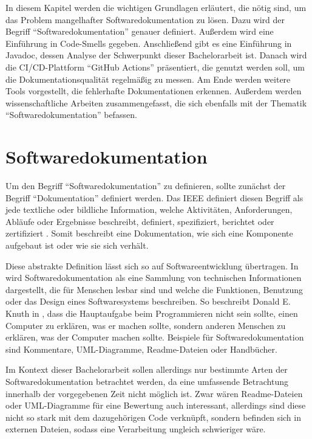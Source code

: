 \label{sec:background}
In diesem Kapitel werden die wichtigen Grundlagen erläutert, die nötig sind, um das Problem mangelhafter Softwaredokumentation zu lösen.  Dazu  wird der Begriff \enquote{Softwaredokumentation} genauer definiert. Außerdem wird eine Einführung in Code-Smells gegeben.  Anschließend gibt es eine Einführung in Javadoc, dessen Analyse der Schwerpunkt dieser Bachelorarbeit ist. Danach wird die \ac{CI/CD}-Plattform \enquote{GitHub Actions} präsentiert, die genutzt werden soll, um die Dokumentationsqualität regelmäßig zu messen. Am Ende werden weitere Tools vorgestellt, die fehlerhafte Dokumentationen erkennen. Außerdem werden wissenschaftliche Arbeiten zusammengefasst, die sich ebenfalls mit der Thematik \enquote{Softwaredokumentation} befassen. 
 

\hfill
\section{Softwaredokumentation}\label{chapter:documentation}
Um den Begriff \enquote{Softwaredokumentation} zu definieren, sollte zunächst der Begriff \enquote{Dokumentation} definiert werden. Das IEEE  definiert diesen Begriff als jede textliche oder bildliche Information, welche Aktivitäten, Anforderungen, Abläufe oder Ergebnisse beschreibt, definiert, spezifiziert, berichtet oder zertifiziert \cite[S.~28]{IEEEStandardGlossaryofSoftwareEngineeringTerminology}. Somit beschreibt eine Dokumentation, wie sich eine Komponente aufgebaut ist oder wie sie sich verhält.

Diese abstrakte Definition lässt sich so auf Softwareentwicklung übertragen. In \cite[S.~125]{Softwaredocumentationandstandards} wird Softwaredokumentation als eine Sammlung von technischen Informationen dargestellt, die für Menschen lesbar sind und welche die Funktionen, Benutzung oder das Design eines Softwaresystems beschreiben. So beschreibt Donald E. Knuth in \cite[S.~97]{LiterateProgramming}, dass die Hauptaufgabe beim Programmieren nicht sein sollte, einen Computer zu erklären, was er machen sollte, sondern anderen Menschen zu erklären, was der Computer machen sollte. Beispiele für Softwaredokumentation sind Kommentare,  UML-Diagramme, Readme-Dateien oder Handbücher.

Im Kontext dieser Bachelorarbeit sollen allerdings nur bestimmte Arten der Softwaredokumentation betrachtet werden, da eine umfassende Betrachtung innerhalb der vorgegebenen Zeit nicht möglich ist.  Zwar wären Readme-Dateien oder UML-Diagramme für eine Bewertung auch interessant, allerdings sind diese nicht so stark mit dem dazugehörigen Code verknüpft, sondern befinden sich in externen Dateien, sodass eine Verarbeitung ungleich schwieriger wäre.

